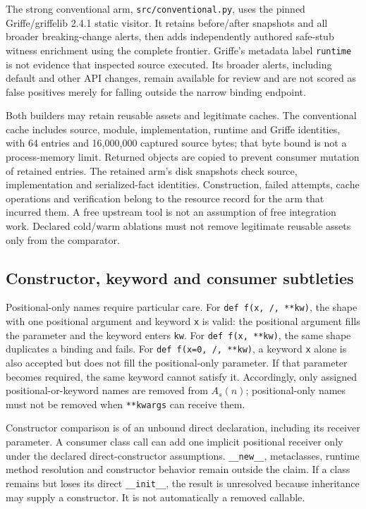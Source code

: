 The strong conventional arm, \texttt{src/conventional.py}, uses the pinned
Griffe/griffelib 2.4.1 static visitor. It retains before/after snapshots and
all broader breaking-change alerts, then adds independently authored
safe-stub witness enrichment using the complete frontier. Griffe's metadata
label \texttt{runtime} is not evidence that inspected source executed.
Its broader alerts, including default and other API changes, remain available
for review and are not scored as false positives merely for falling outside
the narrow binding endpoint.

Both builders may retain reusable assets and legitimate caches. The
conventional cache includes source, module, implementation, runtime and
Griffe identities, with 64 entries and 16,000,000 captured source bytes;
that byte bound is not a process-memory limit. Returned objects are copied
to prevent consumer mutation of retained entries. The retained arm's disk
snapshots check source, implementation and serialized-fact identities.
Construction, failed attempts, cache operations and verification belong to
the resource record for the arm that incurred them. A free upstream tool is
not an assumption of free integration work. Declared cold/warm ablations
must not remove legitimate reusable assets only from the comparator.

\subsection{Constructor, keyword and consumer subtleties}

Positional-only names require particular care. For
\texttt{def f(x, /, **kw)}, the shape with one positional argument and keyword
\texttt{x} is valid: the positional argument fills the parameter and the
keyword enters \texttt{kw}. For
\texttt{def f(x, **kw)}, the same shape duplicates a binding and fails.
For \texttt{def f(x=0, /, **kw)}, a keyword \texttt{x} alone is also accepted
but does not fill the positional-only parameter. If that parameter becomes
required, the same keyword cannot satisfy it. Accordingly, only assigned
positional-or-keyword names are removed from $A_s(n)$; positional-only names
must not be removed when \texttt{**kwargs} can receive them.

Constructor comparison is of an unbound direct declaration, including its
receiver parameter. A consumer class call can add one implicit positional
receiver only under the declared direct-constructor assumptions.
\texttt{\_\_new\_\_}, metaclasses, runtime method resolution and constructor
behavior remain outside the claim. If a class remains but loses its direct
\texttt{\_\_init\_\_}, the result is unresolved because inheritance may
supply a constructor. It is not automatically a removed callable.

